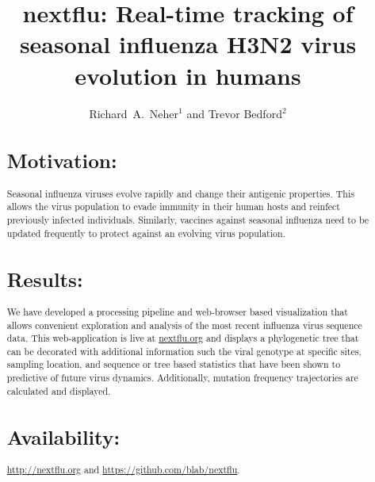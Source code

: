 \documentclass{bioinfo}
\begin{document}
\title[Tracking of seasonal influenza H3N2 virus evolution]{nextflu: Real-time tracking of seasonal influenza H3N2 virus evolution in humans}
\author{Richard~A.~Neher$^{1}$ and Trevor Bedford$^{2}$}
\address{$^{1}$Max Planck Institute for Developmental Biology, 72076 T\"ubingen, Germany, and $^{2}$Vaccine and Infectious Disease Division, Fred Hutchinson Cancer Research Center, Seattle, WA 98109, USA}


\maketitle



\begin{abstract} \section{Motivation:} Seasonal influenza viruses evolve rapidly and change their antigenic properties.
This allows the virus population to evade immunity in their human hosts and reinfect previously infected individuals.
Similarly, vaccines against seasonal influenza need to be updated frequently to protect against an evolving virus population.

\section{Results:} We have developed a processing pipeline and web-browser based visualization that allows convenient exploration and analysis of the most recent influenza virus sequence data.
This web-application is live at \url{nextflu.org} and displays a phylogenetic tree that can be decorated with additional information such the viral genotype at specific sites, sampling location, and sequence or tree based statistics that have been shown to predictive of future virus dynamics.
Additionally, mutation frequency trajectories are calculated and displayed.

\section{Availability:} \url{http://nextflu.org} and \url{https://github.com/blab/nextflu}.
\end{abstract}
\end{document}
